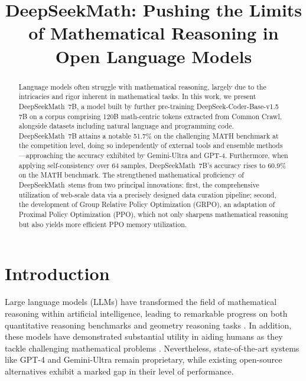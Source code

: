 \title{DeepSeekMath: Pushing the Limits of Mathematical Reasoning in Open Language Models}

\begin{abstract}
Language models often struggle with mathematical reasoning, largely due to the intricacies and rigor inherent in mathematical tasks. In this work, we present DeepSeekMath~7B, a model built by further pre-training DeepSeek-Coder-Base-v1.5 7B on a corpus comprising 120B math-centric tokens extracted from Common Crawl, alongside datasets including natural language and programming code. DeepSeekMath~7B attains a notable 51.7\% on the challenging MATH benchmark at the competition level, doing so independently of external tools and ensemble methods—approaching the accuracy exhibited by Gemini-Ultra and GPT-4. Furthermore, when applying self-consistency over 64 samples, DeepSeekMath~7B's accuracy rises to 60.9\% on the MATH benchmark. The strengthened mathematical proficiency of DeepSeekMath~stems from two principal innovations: first, the comprehensive utilization of web-scale data via a precisely designed data curation pipeline; second, the development of Group Relative Policy Optimization (GRPO), an adaptation of Proximal Policy Optimization (PPO), which not only sharpens mathematical reasoning but also yields more efficient PPO memory utilization.
\end{abstract}

\section{Introduction}

Large language models (LLMs) have transformed the field of mathematical reasoning within artificial intelligence, leading to remarkable progress on both quantitative reasoning benchmarks \citep{MATH} and geometry reasoning tasks \citep{trinh2024solving}. In addition, these models have demonstrated substantial utility in aiding humans as they tackle challenging mathematical problems \citep{tao}. Nevertheless, state-of-the-art systems like GPT-4 \citep{gpt4} and Gemini-Ultra \citep{gemini} remain proprietary, while existing open-source alternatives exhibit a marked gap in their level of performance.


